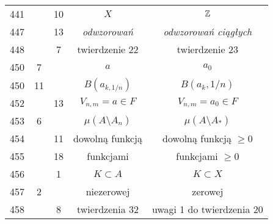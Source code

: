 \documentclass[a4paper,11pt]{article}
\begin{document}
\begin{center}
\begin{tabular}{|c|c|c|c|c|}
    441 & & 10 & $X$ & $\mathbb{Z}$ \\
    447 & & 13 & \textit{odwzorowań} & \textit{odwzorowań ciągłych} \\
    448 & &  7 & twierdzenie 22 & twierdzenie 23 \\
    450 &  7 & & $a$ & $a_{ 0 }$ \\
    450 & 11 & & $B( a_{ k, 1 / n } )$ & $B( a_{ k }, 1 / n )$ \\
    452 & & 13 & $V_{ n, m } = a \in F$ & $V_{ n, m } = a_{ 0 } \in F$ \\
    453 &  6 & & $\mu( A \setminus A_{ n } )$ & $\mu( A \setminus A_{ * } )$ \\
    454 & & 11 & dowolną funkcją & dowolną funkcją $\geq 0$ \\
    455 & & 18 & funkcjami & funkcjami $\geq 0$ \\
    456 & &  1 & $K \subset A$ & $K \subset X$ \\
    457 &  2 & & niezerowej & zerowej \\
    458 & &  8 & twierdzenia 32 & uwagi 1 do twierdzenia 20 \\
    \hline
  \end{tabular}

\end{center}
\end{document}
